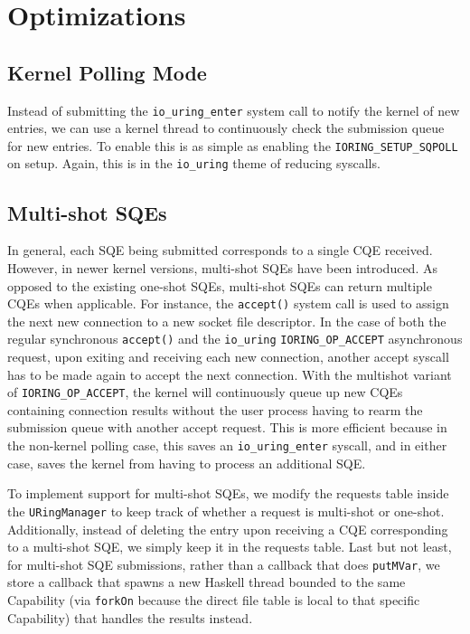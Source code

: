 \chapter{Optimizations}
\section{Kernel Polling Mode} 
Instead of submitting the \texttt{io\_uring\_enter} system call to notify the kernel
of new entries, we can use a kernel thread to continuously check the submission
queue for new entries. To enable this is as simple as enabling the
\texttt{IORING\_SETUP\_SQPOLL} on setup.
Again, this is in the \texttt{io\_uring} theme of reducing syscalls.

\section{Multi-shot SQEs}

In general, each SQE being submitted corresponds to a single CQE received.
However, in newer kernel versions, multi-shot SQEs have been introduced.
As opposed to the existing one-shot SQEs, multi-shot SQEs can return multiple CQEs when applicable.
For instance, the \texttt{accept()} system call is used to assign the next new connection to a new socket file descriptor.
In the case of both the regular synchronous \texttt{accept()} and
the \texttt{io\_uring} \texttt{IORING\_OP\_ACCEPT} asynchronous request,
upon exiting and receiving each new connection, another accept syscall has to be made again to accept the next connection.
With the multishot variant of \texttt{IORING\_OP\_ACCEPT},
the kernel will continuously queue up new CQEs containing connection results without
the user process having to rearm the submission queue with another accept request.
This is more efficient because in the non-kernel polling case, this saves an
\texttt{io\_uring\_enter} syscall, and in either case, saves the kernel from having to process an additional SQE.

To implement support for multi-shot SQEs, we modify the requests table
inside the \texttt{URingManager} to keep track of whether a request is multi-shot or one-shot. 
Additionally, instead of deleting the entry upon receiving a CQE corresponding to a
multi-shot SQE, we simply keep it in the requests table. Last but not least,
for multi-shot SQE submissions, rather
than a callback that does \texttt{putMVar}, we store a callback that spawns a new Haskell
thread bounded to the same Capability (via \texttt{forkOn} because the direct file table
is local to that specific Capability) that handles the results instead.


